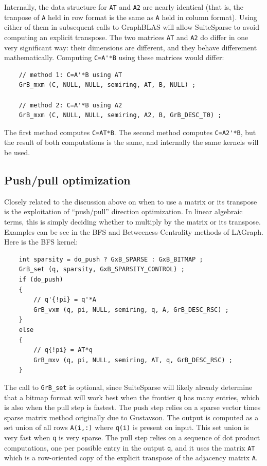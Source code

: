 Internally, the data structure for \verb'AT' and \verb'A2' are nearly identical
(that is, the tranpose of \verb'A' held in row format is the same as \verb'A'
held in column format).  Using either of them in subsequent calls to GraphBLAS
will allow SuiteSparse to avoid computing an explicit transpose.  The two
matrices \verb'AT' and \verb'A2' do differ in one very significant way:  their
dimensions are different, and they behave differement mathematically.
Computing \verb"C=A'*B" using these matrices would differ:

    {\footnotesize
    \begin{verbatim}
    // method 1: C=A'*B using AT
    GrB_mxm (C, NULL, NULL, semiring, AT, B, NULL) ;

    // method 2: C=A'*B using A2
    GrB_mxm (C, NULL, NULL, semiring, A2, B, GrB_DESC_T0) ; \end{verbatim}}

The first method computes \verb'C=AT*B'.  The second method computes
\verb"C=A2'*B", but the result of both computations is the same, and internally
the same kernels will be used.

\subsection{Push/pull optimization}

Closely related to the discussion above on when to use a matrix or its
transpose is the exploitation of ``push/pull'' direction optimization.  In
linear algebraic terms, this is simply deciding whether to multiply by the
matrix or its transpose.  Examples can be see in the BFS and
Betweeness-Centrality methods of LAGraph.  Here is the BFS kernel:

    {\footnotesize
    \begin{verbatim}
    int sparsity = do_push ? GxB_SPARSE : GxB_BITMAP ;
    GrB_set (q, sparsity, GxB_SPARSITY_CONTROL) ;
    if (do_push)
    {
        // q'{!pi} = q'*A
        GrB_vxm (q, pi, NULL, semiring, q, A, GrB_DESC_RSC) ;
    }
    else
    {
        // q{!pi} = AT*q
        GrB_mxv (q, pi, NULL, semiring, AT, q, GrB_DESC_RSC) ;
    }\end{verbatim}}

The call to \verb'GrB_set' is optional, since SuiteSparse will likely already
determine that a bitmap format will work best when the frontier \verb'q' has
many entries, which is also when the pull step is fastest.  The push step
relies on a sparse vector times sparse matrix method originally due to
Gustavson.  The output is computed as a set union of all rows \verb'A(i,:)'
where \verb'q(i)' is present on input.  This set union is very fast when
\verb'q' is very sparse.  The pull step relies on a sequence of dot product
computations, one per possible entry in the output \verb'q', and it uses the
matrix \verb"AT" which is a row-oriented copy of the explicit transpose of the
adjacency matrix \verb'A'.

